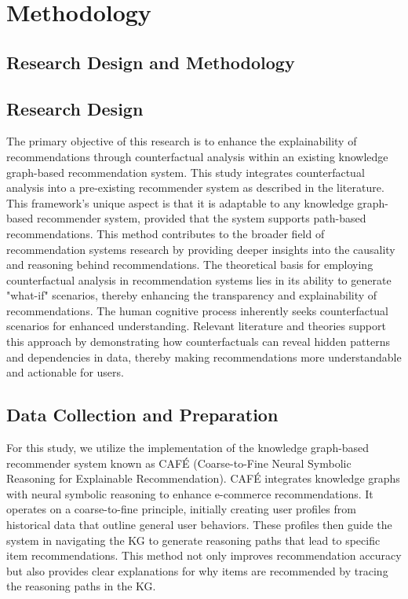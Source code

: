 \chapter{Methodology}\label{chap:methodology}

\section{Research Design and Methodology}
\section{Research Design}

The primary objective of this research is to enhance the explainability of recommendations through counterfactual analysis within an existing knowledge graph-based recommendation system. This study integrates counterfactual analysis into a pre-existing recommender system as described in the literature. This framework's unique aspect is that it is adaptable to any knowledge graph-based recommender system, provided that the system supports path-based recommendations. This method contributes to the broader field of recommendation systems research by providing deeper insights into the causality and reasoning behind recommendations.
The theoretical basis for employing counterfactual analysis in recommendation systems lies in its ability to generate "what-if" scenarios, thereby enhancing the transparency and explainability of recommendations. The human cognitive process inherently seeks counterfactual scenarios for enhanced understanding. Relevant literature and theories support this approach by demonstrating how counterfactuals can reveal hidden patterns and dependencies in data, thereby making recommendations more understandable and actionable for users.


\section{Data Collection and Preparation}
For this study, we utilize the implementation of the knowledge graph-based recommender system known as CAFÉ (Coarse-to-Fine Neural Symbolic Reasoning for Explainable Recommendation). CAFÉ integrates knowledge graphs with neural symbolic reasoning to enhance e-commerce recommendations. It operates on a coarse-to-fine principle, initially creating user profiles from historical data that outline general user behaviors. These profiles then guide the system in navigating the KG to generate reasoning paths that lead to specific item recommendations. This method not only improves recommendation accuracy but also provides clear explanations for why items are recommended by tracing the reasoning paths in the KG.




